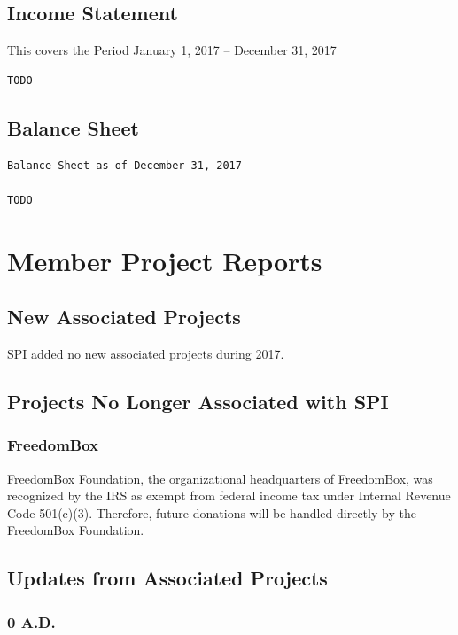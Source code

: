 \documentclass[a4paper]{report}
\begin{document}
\section{Income Statement}

This covers the Period January 1, 2017 -- December 31, 2017

\begin{verbatim}
TODO
\end{verbatim}

\section{Balance Sheet}

\begin{verbatim}
Balance Sheet as of December 31, 2017

TODO
\end{verbatim}

\chapter{Member Project Reports}

\section{New Associated Projects}

SPI added no new associated projects during 2017.

\section{Projects No Longer Associated with SPI}

\subsection{FreedomBox}

FreedomBox Foundation, the organizational headquarters of FreedomBox,
was recognized by the IRS as exempt from federal income tax under
Internal Revenue Code 501(c)(3).  Therefore, future donations will
be handled directly by the FreedomBox Foundation.

\section{Updates from Associated Projects}

\subsection{0 A.D.}
\end{document}
